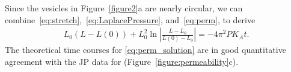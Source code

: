 \documentclass[lineno]{jfm}
\newcommand{\xx}{\mathbf{x}}
\newcommand{\uu}{\mathbf{u}}
\begin{document}
Since the vesicles in Figure~\ref{figure2}a are nearly circular, we can
combine~\eqref{eq:stretch},~\eqref{eq:LaplacePressure},
and~\eqref{eq:perm}, to derive
\begin{align}
\label{eq:perm_solution}
L_0(L-L(0)) + L_0^2 \ln\left|\frac{L-L_0}{L(0)-L_0}\right| = -4\pi^2 P K_A t.
\end{align}
The theoretical time courses for \eqref{eq:perm_solution} are in good
quantitative agreement with the JP data for
(Figure~\ref{figure:permeability}c).




%
%





\end{document}
